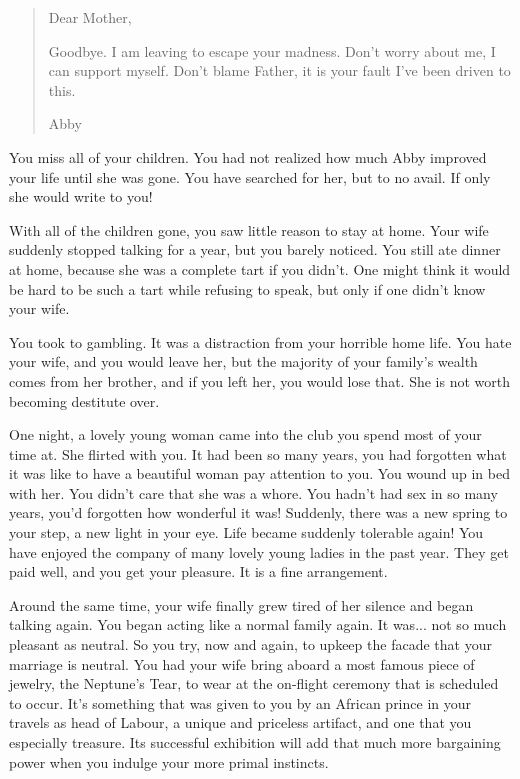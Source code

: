 \documentclass[char]{airship}
\begin{document}
\begin{quote}
Dear Mother,

Goodbye. I am leaving to escape your madness. Don't worry about me, I
can support myself. Don't blame Father, it is your fault I've been
driven to this.

Abby
\end{quote} 

You miss all of your children. You had not realized how much Abby
improved your life until she was gone. You have searched for her, but
to no avail. If only she would write to you!

With all of the children gone, you saw little reason to stay at
home. Your wife suddenly stopped talking for a year, but you barely
noticed. You still ate dinner at home, because she was a complete tart
if you didn't. One might think it would be hard to be such a tart while
refusing to speak, but only if one didn't know your wife.

You took to gambling. It was a distraction from your horrible home
life. You hate your wife, and you would leave her, but the majority of
your family's wealth comes from her brother, and if you left her, you
would lose that. She is not worth becoming destitute over. 

One night, a lovely young woman came into the club you spend most of
your time at. She flirted with you. It had been so many years, you had
forgotten what it was like to have a beautiful woman pay attention to
you. You wound up in bed with her. You didn't care that she was a
whore. You hadn't had sex in so many years, you'd forgotten how
wonderful it was! Suddenly, there was a new spring to your step, a new
light in your eye. Life became suddenly tolerable again! You have
enjoyed the company of many lovely young ladies in the past year. They
get paid well, and you get your pleasure. It is a fine arrangement.

Around the same time, your wife finally grew tired of her silence and
began talking again. You began acting like a normal family again. It
was... not so much pleasant as neutral. So you try, now and again, to
upkeep the facade that your marriage is neutral. You had your wife
bring aboard a most famous piece of jewelry, the Neptune's Tear, to
wear at the on-flight ceremony that is scheduled to occur. It's
something that was given to you by an African prince in your travels
as head of Labour, a unique and priceless artifact, and one that you
especially treasure. Its successful exhibition will add that much more
bargaining power when you indulge your more primal instincts.
\end{document}
